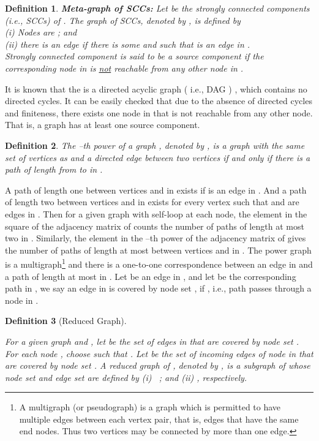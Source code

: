 \documentclass[letterpaper, 11pt]{article}
\newtheorem{definition}{Definition}[section]
\begin{document}
\begin{definition}
\label{def:decompose}
{\bf Meta-graph of SCCs:}
Let  be the strongly connected components (i.e., SCCs) of . The graph of SCCs, denoted by , is defined by\\
(i) Nodes are ; and\\
(ii) there is an edge  if there is some  and  such that  is an edge in .\\
Strongly connected component  is said to be a {\em source component}
if the corresponding node in  is \underline{not} reachable from any
other node in .
\end{definition}
It is known that the  is a directed acyclic graph ( i.e., DAG ) \cite{dag_decomposition}, which contains no directed cycles. It can be easily checked that due to the absence of directed cycles and finiteness, there exists one node in  that is not reachable from any other node. That is, a graph  has at least one source component.
\begin{definition}
The --th power of a graph , denoted by ,  is a graph with the same set of vertices as  and a directed edge between two vertices  if and only if there is a path of length  from  to  in .
\end{definition}

A path of length one between vertices  and  in  exists if  is an edge in . And a path of length two between vertices  and  in  exists for every vertex  such that  and  are edges in .
Then for a given graph  with self-loop at each node,
the  element in the square of the adjacency matrix of  counts the number of paths of length at most two in . Similarly, the  element in the --th power of the adjacency matrix of  gives the number of paths of length at most  between vertices  and  in .
The power graph  is a multigraph\footnote{A multigraph (or pseudograph) is a graph which is permitted to have multiple edges between each vertex pair, that is, edges that have the same end nodes. Thus two vertices may be connected by more than one edge.} and there is a one-to-one correspondence between an edge  in  and a path of length at most  in . Let  be an edge in , and let  be the corresponding path in , we say an edge  in  is covered by node set , if , i.e., path  passes through a node in .



\begin{definition}[Reduced Graph]
\label{def:reduced} 

For a given graph  and , let  be the set of edges in  that are covered by node set . For each node , choose  such that . Let  be the set of incoming edges of node  in  that are covered by node set .
  A reduced graph of , denoted by , is a subgraph of  whose node set and edge set are defined by (i)~ ; and
(ii) , respectively.
\end{definition}
\end{document}

